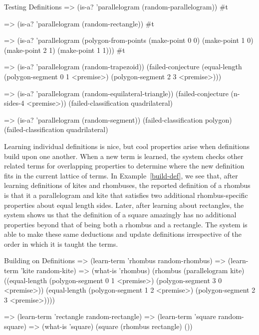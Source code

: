 \begin{repl-example}
[label=test-def]
{Testing Definitions}
=> (is-a? 'parallelogram (random-parallelogram))
#t

=> (is-a? 'parallelogram (random-rectangle))
#t

=> (is-a? 'parallelogram (polygon-from-points
                (make-point 0 0)
                (make-point 1 0)
                (make-point 2 1)
                (make-point 1 1)))
#t

=> (is-a? 'parallelogram (random-trapezoid))
(failed-conjecture
 (equal-length (polygon-segment 0 1 <premise>)
               (polygon-segment 2 3 <premise>)))

=> (is-a? 'parallelogram (random-equilateral-triangle))
(failed-conjecture (n-sides-4 <premise>))
(failed-classification quadrilateral)

=> (is-a? 'parallelogram (random-segment))
(failed-classification polygon)
(failed-classification quadrilateral)
\end{repl-example}

Learning individual definitions is nice, but cool properties arise
when definitions build upon one another. When a new term is learned,
the system checks other related terms for overlapping properties to
determine where the new definition fits in the current lattice of
terms. In Example~\ref{build-def}, we see that, after learning
definitions of kites and rhombuses, the reported definition of a
rhombus is that it a parallelogram and kite that satisfies two
additional rhombus-specific properties about equal length
sides. Later, after learning about rectangles, the system shows us
that the definition of a square amazingly has no additional properties
beyond that of being both a rhombus and a rectangle. The system is
able to make these same deductions and update definitions irrespective
of the order in which it is taught the terms.

\begin{repl-example}
[label=build-def]
{Building on Definitions}
=> (learn-term 'rhombus random-rhombus)
=> (learn-term 'kite random-kite)
=> (what-is 'rhombus)
(rhombus
 (parallelogram kite)
 ((equal-length (polygon-segment 0 1 <premise>)
                (polygon-segment 3 0 <premise>))
  (equal-length (polygon-segment 1 2 <premise>)
                (polygon-segment 2 3 <premise>))))

=> (learn-term 'rectangle random-rectangle)
=> (learn-term 'square random-square)
=> (what-is 'square)
(square (rhombus rectangle) ())
\end{repl-example}

